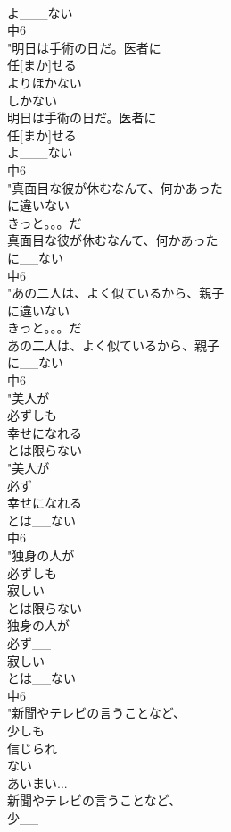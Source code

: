 \documentclass[8pt]{extreport}
\begin{document}
\begin{CJK}{UTF8}{min}
\\	よ___ない
\\	中6
\\	"明日は手術の日だ。医者に
\\	任[まか]せる
\\	よりほかない
\\	しかない	
\\	明日は手術の日だ。医者に
\\	任[まか]せる
\\	よ___ない
\\	中6
\\	"真面目な彼が休むなんて、何かあった
\\	に違いない
\\	きっと。。。だ	
\\	真面目な彼が休むなんて、何かあった
\\	に__ない
\\	中6
\\	"あの二人は、よく似ているから、親子
\\	に違いない
\\	きっと。。。だ	
\\	あの二人は、よく似ているから、親子
\\	に__ない
\\	中6
\\	"美人が
\\	必ずしも
\\	幸せになれる
\\	とは限らない
\\	"美人が
\\	必ず__
\\	幸せになれる
\\	とは__ない
\\	中6
\\	"独身の人が
\\	必ずしも
\\	寂しい
\\	とは限らない
\\	独身の人が
\\	必ず__
\\	寂しい
\\	とは__ない
\\	中6
\\	"新聞やテレビの言うことなど、
\\	少しも
\\	信じられ
\\	ない
\\	あいまい...
\\	新聞やテレビの言うことなど、
\\	少__

\end{CJK}
\end{document}
